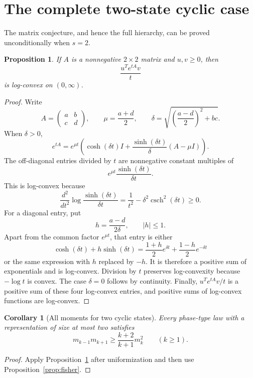\documentclass[11pt]{article}
\newtheorem{proposition}[theorem]{Proposition}
\newtheorem{corollary}[theorem]{Corollary}
\theoremstyle{remark}
\begin{document}
\section{The complete two-state cyclic case}

The matrix conjecture, and hence the full hierarchy, can be proved
unconditionally when \(s=2\).

\begin{proposition}\label{prop:two-by-two}
If \(A\) is a nonnegative \(2\times2\) matrix and \(u,v\geq0\), then
\[
  \frac{u^Te^{tA}v}{t}
\]
is log-convex on \((0,\infty)\).
\end{proposition}

\begin{proof}
Write
\[
 A=\begin{pmatrix}a&b\\c&d\end{pmatrix},\qquad
 \mu=\frac{a+d}{2},\qquad
 \delta=\sqrt{\left(\frac{a-d}{2}\right)^2+bc}.
\]
When \(\delta>0\),
\[
 e^{tA}=e^{\mu t}\left(
   \cosh(\delta t)I+
   \frac{\sinh(\delta t)}{\delta}(A-\mu I)\right).
\]
The off-diagonal entries divided by \(t\) are nonnegative constant
multiples of
\[
 e^{\mu t}\frac{\sinh(\delta t)}{\delta t}.
\]
This is log-convex because
\[
 \frac{d^2}{dt^2}\log\frac{\sinh(\delta t)}{\delta t}
 =\frac1{t^2}-\delta^2\operatorname{csch}^2(\delta t)\geq0.
\]
For a diagonal entry, put
\[
 h=\frac{a-d}{2\delta},\qquad |h|\leq1.
\]
Apart from the common factor \(e^{\mu t}\), that entry is either
\[
 \cosh(\delta t)+h\sinh(\delta t)
 =\frac{1+h}{2}e^{\delta t}+\frac{1-h}{2}e^{-\delta t}
\]
or the same expression with \(h\) replaced by \(-h\).  It is therefore a
positive sum of exponentials and is log-convex.  Division by \(t\) preserves
log-convexity because \(-\log t\) is convex.  The case \(\delta=0\) follows by
continuity.  Finally, \(u^Te^{tA}v/t\) is a positive sum of these four
log-convex entries, and positive sums of log-convex functions are
log-convex.
\end{proof}

\begin{corollary}[All moments for two cyclic states]
Every phase-type law with a representation of size at most two satisfies
\[
 m_{k-1}m_{k+1}\geq\frac{k+2}{k+1}m_k^2
 \qquad(k\geq1).
\]
\end{corollary}

\begin{proof}
Apply Proposition~\ref{prop:two-by-two} after uniformization and then use
Proposition~\ref{prop:fisher}.
\end{proof}
\end{document}
